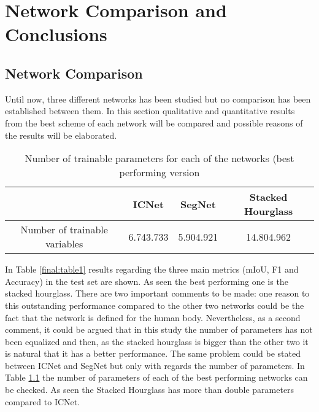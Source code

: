 
\chapter{Network Comparison and Conclusions} %

\label{Chapter3} %




\section{Network Comparison}

Until now, three different networks has been studied but no comparison has been established between them. In this section qualitative and quantitative results from the best scheme of each network will be compared and possible reasons of the results will be elaborated.\\

\begin{table}[h!]
  \begin{center}
    
    \begin{tabular}{|c|c|c|c|} %
    \hline
      \textbf{} & \textbf{ ICNet} & \textbf{SegNet} & \textbf{Stacked Hourglass} \\
      \hline
      Number of trainable variables & 6.743.733 & 5.904.921 & 14.804.962\\     
      \hline
    \end{tabular}
    \caption{Number of trainable parameters for each of the networks (best performing version}
    \label{final:table3}
  \end{center}
\end{table}

In Table \ref{final:table1} results regarding the three main metrics (mIoU, F1 and Accuracy) in the test set are shown. As seen the best performing one is the stacked hourglass. There are two important comments to be made: one reason to this outstanding performance compared to the other two networks could be the fact that the network is defined for the human body. Nevertheless, as a second comment, it could be argued that in this study the number of parameters has not been equalized and then, as the stacked hourglass is bigger than the other two it is natural that it has a better performance. The same problem could be stated between ICNet and SegNet but only with regards the number of parameters. In Table \ref{final:table3} the number of parameters of each of the best performing networks can be checked. As seen the Stacked Hourglass has more than double parameters compared to ICNet.\\
 
